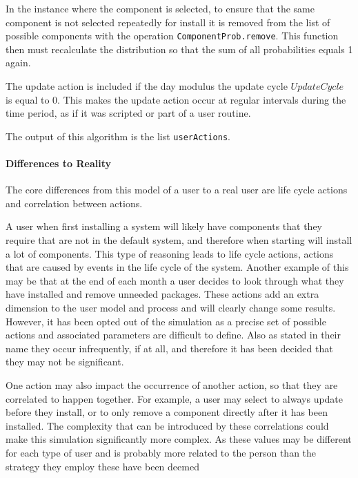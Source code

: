 In the instance where the component is selected, to ensure that the same component is not selected repeatedly for install it is removed from the list of possible components
with the operation \verb+ComponentProb.remove+.
This function then must recalculate the distribution so that the sum of all probabilities equals 1 again.

The update action is included if the day modulus the update cycle $UpdateCycle$ is equal to 0.
This makes the update action occur at regular intervals during the time period, as if it was scripted or part of a user routine.

The output of this algorithm is the list \verb+userActions+.

\paragraph{Differences to Reality}
The core differences from this model of a user to a real user are life cycle actions and correlation between actions.

A user when first installing a system will likely have components that they require that are not in the default system, and therefore when starting will install a lot of components.
This type of reasoning leads to life cycle actions, actions that are caused by events in the life cycle of the system.
Another example of this may be that at the end of each month a user decides to look through what they have installed and remove unneeded packages.
These actions add an extra dimension to the user model and process and will clearly change some results.
However, it has been opted out of the simulation as a precise set of possible actions and associated parameters are difficult to define.
Also as stated in their name they occur infrequently, if at all, and therefore it has been decided that they may not be significant.  

One action may also impact the occurrence of another action, so that they are correlated to happen together.
For example, a user may select to always update before they install, or to only remove a component directly after it has been installed.
The complexity that can be introduced by these correlations could make this simulation significantly more complex.
As these values may be different for each type of user and is probably more related to the person than the strategy they employ these have been deemed 

